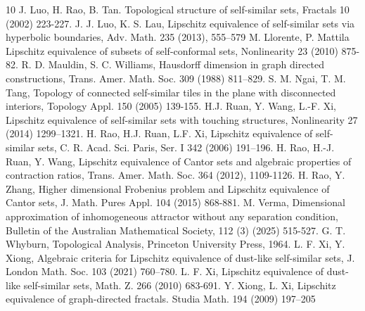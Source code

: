 \documentclass[a4paper,12pt,reqno]{amsart}
\numberwithin{equation}{section}
\theoremstyle{definition}
\theoremstyle{remark}
\numberwithin{equation}{section}
\begin{document}
\begin{thebibliography}{10}
    J. Luo, H. Rao, B. Tan. Topological structure of self-similar sets, Fractals 10 (2002) 223-227.
   J. J. Luo, K. S. Lau, Lipschitz equivalence of self-similar sets via hyperbolic boundaries, Adv. Math. 235 (2013), 555–579
 M. Llorente, P. Mattila Lipschitz equivalence of subsets of self-conformal sets, Nonlinearity 23 (2010) 875-82.
   R. D. Mauldin, S. C. Williams, Hausdorff dimension in graph directed constructions, Trans. Amer. Math. Soc. 309 (1988) 811–829.
   S. M. Ngai, T. M. Tang, Topology of connected self-similar tiles in the plane with disconnected interiors, Topology Appl. 150 (2005) 139-155.
  H.J. Ruan, Y. Wang, L.-F. Xi, Lipschitz equivalence of self-similar sets with touching structures, Nonlinearity 27 (2014) 1299–1321.
   H. Rao, H.J. Ruan, L.F. Xi, Lipschitz equivalence of self-similar sets, C. R. Acad. Sci. Paris, Ser. I 342 (2006) 191–196.
  H. Rao, H.-J. Ruan, Y. Wang, Lipschitz equivalence of Cantor sets and algebraic properties of contraction ratios, Trans. Amer. Math. Soc. 364 (2012), 1109-1126.
 H. Rao, Y. Zhang, Higher dimensional Frobenius problem and Lipschitz equivalence of Cantor sets, J. Math. Pures Appl. 104 (2015) 868-881.
 M. Verma, Dimensional approximation of inhomogeneous attractor without any separation condition, Bulletin of the Australian Mathematical Society, 112 (3) (2025) 515-527.
 G. T. Whyburn, Topological Analysis, Princeton University Press, 1964.
  L. F. Xi, Y. Xiong, Algebraic criteria for Lipschitz equivalence of dust-like self-similar sets, J. London Math. Soc. 103 (2021) 760–780.
  L. F. Xi, Lipschitz equivalence of dust-like self-similar sets, Math. Z. 266 (2010) 683-691.
 Y. Xiong, L. Xi, Lipschitz equivalence of graph-directed fractals. Studia Math. 194 (2009) 197–205


      
		
		
		
		

		
	

\end{thebibliography}
\end{document}
